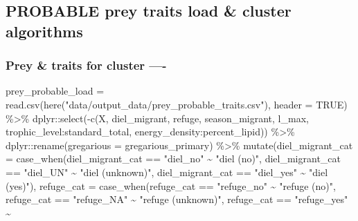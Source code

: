 \documentclass[
]{article}
\newenvironment{Shaded}{\begin{snugshade}}{\end{snugshade}}
\newcommand{\AttributeTok}[1]{\textcolor[rgb]{0.77,0.63,0.00}{#1}}
\newcommand{\ConstantTok}[1]{\textcolor[rgb]{0.00,0.00,0.00}{#1}}
\newcommand{\FunctionTok}[1]{\textcolor[rgb]{0.00,0.00,0.00}{#1}}
\newcommand{\NormalTok}[1]{#1}
\newcommand{\OtherTok}[1]{\textcolor[rgb]{0.56,0.35,0.01}{#1}}
\newcommand{\SpecialCharTok}[1]{\textcolor[rgb]{0.00,0.00,0.00}{#1}}
\newcommand{\StringTok}[1]{\textcolor[rgb]{0.31,0.60,0.02}{#1}}
\begin{document}
\hypertarget{probable-prey-traits-load-cluster-algorithms}{%
\subsection{PROBABLE prey traits load \& cluster
algorithms}\label{probable-prey-traits-load-cluster-algorithms}}

\hypertarget{prey-traits-for-cluster--}{%
\subsubsection{Prey \& traits for cluster
----}\label{prey-traits-for-cluster--}}

\begin{Shaded}
\begin{Highlighting}[]
\NormalTok{prey\_probable\_load }\OtherTok{=} \FunctionTok{read.csv}\NormalTok{(}\FunctionTok{here}\NormalTok{(}\StringTok{"data/output\_data/prey\_probable\_traits.csv"}\NormalTok{),}
    \AttributeTok{header =} \ConstantTok{TRUE}\NormalTok{) }\SpecialCharTok{\%\textgreater{}\%}
\NormalTok{    dplyr}\SpecialCharTok{::}\FunctionTok{select}\NormalTok{(}\SpecialCharTok{{-}}\FunctionTok{c}\NormalTok{(X, diel\_migrant, refuge, season\_migrant, l\_max, trophic\_level}\SpecialCharTok{:}\NormalTok{standard\_total,}
\NormalTok{        energy\_density}\SpecialCharTok{:}\NormalTok{percent\_lipid)) }\SpecialCharTok{\%\textgreater{}\%}
\NormalTok{    dplyr}\SpecialCharTok{::}\FunctionTok{rename}\NormalTok{(}\AttributeTok{gregarious =}\NormalTok{ gregarious\_primary) }\SpecialCharTok{\%\textgreater{}\%}
    \FunctionTok{mutate}\NormalTok{(}\AttributeTok{diel\_migrant\_cat =} \FunctionTok{case\_when}\NormalTok{(diel\_migrant\_cat }\SpecialCharTok{==} \StringTok{"diel\_no"} \SpecialCharTok{\textasciitilde{}} \StringTok{"diel (no)"}\NormalTok{,}
\NormalTok{        diel\_migrant\_cat }\SpecialCharTok{==} \StringTok{"diel\_UN"} \SpecialCharTok{\textasciitilde{}} \StringTok{"diel (unknown)"}\NormalTok{, diel\_migrant\_cat }\SpecialCharTok{==} \StringTok{"diel\_yes"} \SpecialCharTok{\textasciitilde{}}
            \StringTok{"diel (yes)"}\NormalTok{), }\AttributeTok{refuge\_cat =} \FunctionTok{case\_when}\NormalTok{(refuge\_cat }\SpecialCharTok{==} \StringTok{"refuge\_no"} \SpecialCharTok{\textasciitilde{}} \StringTok{"refuge (no)"}\NormalTok{,}
\NormalTok{        refuge\_cat }\SpecialCharTok{==} \StringTok{"refuge\_NA"} \SpecialCharTok{\textasciitilde{}} \StringTok{"refuge (unknown)"}\NormalTok{, refuge\_cat }\SpecialCharTok{==} \StringTok{"refuge\_yes"} \SpecialCharTok{\textasciitilde{}}

\end{Highlighting}
\end{Shaded}
\end{document}
